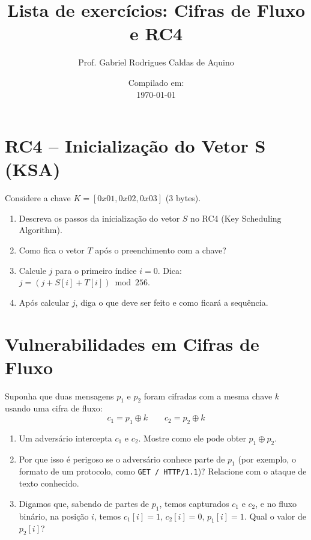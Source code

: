 \title{Lista de exercícios: Cifras de Fluxo e RC4}
\author{Prof. Gabriel Rodrigues Caldas de Aquino}
\date{Compilado em: \\ \today}



\maketitle
\section{RC4 – Inicialização do Vetor S (KSA)}  

    
    
    Considere a chave $K=[0x01,0x02,0x03]$ (3 bytes).
    \begin{enumerate}
        \item Descreva os passos da inicialização do vetor $S$ no RC4 (Key Scheduling Algorithm).
        \item Como fica o vetor $T$ após o preenchimento com a chave?
        \item Calcule $j$ para o primeiro índice $i=0$. Dica: $j=(j+S[i]+T[i]) \bmod 256$.
        \item Após calcular $j$, diga o que deve ser feito e como ficará a sequência.
    \end{enumerate}

\section{Vulnerabilidades em Cifras de Fluxo}  
    
    Suponha que duas mensagens $p_1$ e $p_2$ foram cifradas com a mesma chave $k$ usando uma cifra de fluxo:
    \[
        c_1 = p_1 \oplus k \quad\quad c_2 = p_2 \oplus k
    \]
    \begin{enumerate}
        \item Um adversário intercepta $c_1$ e $c_2$. Mostre como ele pode obter $p_1 \oplus p_2$.
        \item Por que isso é perigoso se o adversário conhece parte de $p_1$ (por exemplo, o formato de um protocolo, como \texttt{GET / HTTP/1.1})? Relacione com o ataque de texto conhecido.
        \item Digamos que, sabendo de partes de $p_1$, temos capturados $c_1$ e $c_2$, e no fluxo binário, na posição $i$, temos $c_1[i] = 1$, $c_2[i] = 0$, $p_1[i] = 1$. Qual o valor de $p_2[i]$?
    \end{enumerate}


